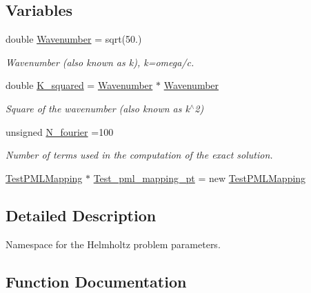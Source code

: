 \subsection*{Variables}
\begin{DoxyCompactItemize}
\item 
double \hyperlink{namespaceGlobalParameters_a571b847702904d4cf646ac7ff17a7d2c}{Wavenumber} = sqrt(50.)
\begin{DoxyCompactList}\small\item\em Wavenumber (also known as k), k=omega/c. \end{DoxyCompactList}\item 
double \hyperlink{namespaceGlobalParameters_aae73cb63b27d51a87845c3392cd944eb}{K\+\_\+squared} = \hyperlink{namespaceGlobalParameters_a571b847702904d4cf646ac7ff17a7d2c}{Wavenumber} $\ast$ \hyperlink{namespaceGlobalParameters_a571b847702904d4cf646ac7ff17a7d2c}{Wavenumber}
\begin{DoxyCompactList}\small\item\em Square of the wavenumber (also known as k$^\wedge$2) \end{DoxyCompactList}\item 
unsigned \hyperlink{namespaceGlobalParameters_ae4df03bf0ffa55b741ac846ca7b6c155}{N\+\_\+fourier} =100
\begin{DoxyCompactList}\small\item\em Number of terms used in the computation of the exact solution. \end{DoxyCompactList}\item 
\hyperlink{classGlobalParameters_1_1TestPMLMapping}{Test\+P\+M\+L\+Mapping} $\ast$ \hyperlink{namespaceGlobalParameters_a66c84b0ba0a324423154d08c56051d0b}{Test\+\_\+pml\+\_\+mapping\+\_\+pt} = new \hyperlink{classGlobalParameters_1_1TestPMLMapping}{Test\+P\+M\+L\+Mapping}
\end{DoxyCompactItemize}


\subsection{Detailed Description}
Namespace for the Helmholtz problem parameters. 

\subsection{Function Documentation}
\mbox{\label{namespaceGlobalParameters_ae2320da6053f5527b2af5ebb362a8a07}} 
